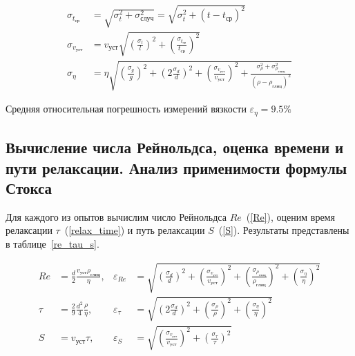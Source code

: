 \documentclass[a4paper, 12pt]{article}
\begin{document}
    \begin{align*}
        \sigma_{t_{ср}} &= \sqrt{\sigma_t^2 + \sigma_{случ}^2} = \sqrt{\sigma_t^2 + (t - t_{ср})^2} \\
        \sigma_{v_{уст}} &= v_{уст}\sqrt{\left( \frac{\sigma_l}{l}\right)^2 + \left(\frac{\sigma_{t_{ср}}}{t_{ср}} \right)^2}\\
         \sigma_{\eta} &= \eta \sqrt{\left( \frac{\sigma_g}{g}\right)^2 + \left( 2\frac{\sigma_d}{d}\right)^2 + \left( \frac{\sigma_{v_{уст}}}{v_{уст}}\right)^2 + \frac{\sigma_{\rho}^2 + \sigma_{\rho_{глиц}}^2}{(\rho - \rho_{глиц})^2}}
    \end{align*}

    Средняя относительная погрешность измерений вязкости $\varepsilon_{\eta} = 9.5\% $

    \subsection{Вычисление числа Рейнольдса, оценка времени и пути релаксации. Анализ применимости формулы Стокса}

    Для каждого из опытов вычислим число Рейнольдса $Re$~(\ref{Re}), оценим время релаксации $\tau$~(\ref{relax_time}) и путь релаксации $S$~(\ref{S}). Результаты представлены в таблице~\ref{re_tau_s}.

    \begin{align}
        Re &= \frac{d}{2} \frac{v_{уст} \rho_{глиц}}{\eta}, & \varepsilon_{Re} &= \sqrt{\left( \frac{\sigma_d}{d} \right)^2 + \left( \frac{\sigma_{v_{уст}}}{v_{уст}} \right)^2 + \left( \frac{\sigma_{\rho_{глиц}}}{\rho_{глиц}} \right)^2 + \left( \frac{\sigma_{\eta}}{\eta} \right)^2}\label{Re}\\
        \tau &= \frac{2}{9} \frac{d^2}{4} \frac{\rho}{\eta}, & \varepsilon_{\tau} &= \sqrt{\left( 2\frac{\sigma_d}{d} \right)^2  + \left( \frac{\sigma_{\rho}}{\rho} \right)^2 + \left( \frac{\sigma_{\eta}}{\eta} \right)^2}\label{relax_time}\\
        S &= v_{уст} \tau, & \varepsilon_S &= \sqrt{\left( \frac{\sigma_{v_{уст}}}{v_{уст}} \right)^2  + \left( \frac{\sigma_{\tau}}{\tau} \right)^2}\label{S}
    \end{align}
\end{document}
